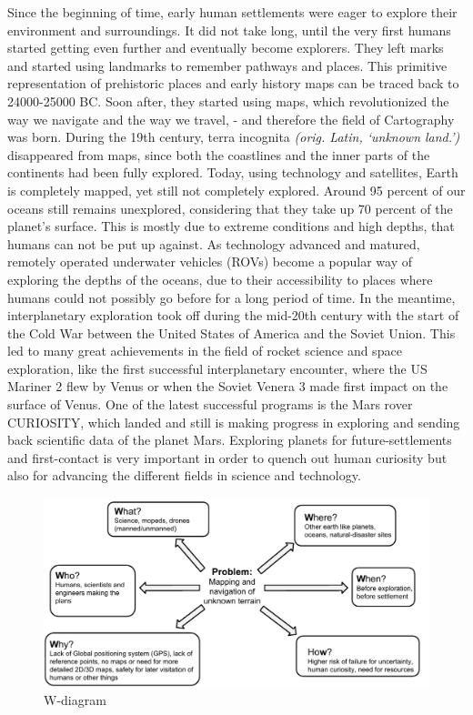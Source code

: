 Since the beginning of time, early human settlements were eager to explore their environment and surroundings. It did not take long, until the very first humans started getting even further and eventually become explorers. They left marks and started using landmarks to remember pathways and places. This primitive representation of prehistoric places and early history maps can be traced back to 24000-25000 BC\cite{cavedrawings}. Soon after, they started using maps, which revolutionized the way we navigate and the way we travel, - and therefore the field of Cartography was born. During the 19th century, terra incognita \textit{(orig. Latin, ‘unknown land.’)} disappeared from maps, since both the coastlines and the inner parts of the continents had been fully explored. Today, using technology and satellites, Earth is completely mapped\cite{earth-mapped}, yet still not completely explored\cite{earth-explored}. Around 95 percent of our oceans still remains unexplored, considering that they take up 70 percent of the planet's surface\cite{oceandepth}. This is mostly due to extreme conditions and high depths, that humans can not be put up against. As technology advanced and matured, remotely operated underwater vehicles (ROVs) become a popular way of exploring the depths of the oceans, due to their accessibility to places where humans could not possibly go before for a long period of time. In the meantime, interplanetary exploration took off during the mid-20th century with the start of the Cold War between the United States of America and the Soviet Union. This led to many great achievements in the field of rocket science and space exploration, like the first successful interplanetary encounter, where the US Mariner 2 flew by Venus\cite{firstflyby} or when the Soviet Venera 3 made first impact on the surface of Venus\cite{firstimpact}. One of the latest successful programs is the Mars rover CURIOSITY\cite{curiosity}, which landed and still is making progress in exploring and sending back scientific data of the planet Mars. Exploring planets for future-settlements and first-contact is very important in order to quench out human curiosity but also for advancing the different fields in science and technology.

\clearpage

\begin{figure}[!h]
	\centering
	\includegraphics[scale=.7]{images/wdiagram2.pdf}
	\caption{W-diagram}
	\label{fig:wdiagram}
\end{figure}

